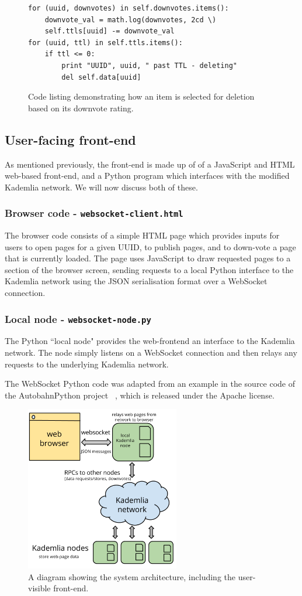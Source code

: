 \begin{figure}[H]
	\begin{lstlisting}
for (uuid, downvotes) in self.downvotes.items():
    downvote_val = math.log(downvotes, 2cd \)
    self.ttls[uuid] -= downvote_val
for (uuid, ttl) in self.ttls.items():
    if ttl <= 0:
        print "UUID", uuid, " past TTL - deleting"
        del self.data[uuid]
	\end{lstlisting}
    \caption{Code listing demonstrating how an item is selected for deletion based on its downvote rating.}
    \label{fig:code-downvote}
\end{figure}

\subsection{User-facing front-end}

As mentioned previously, the front-end is made up of of a JavaScript and HTML web-based front-end, and a Python program which
interfaces with the modified Kademlia network. We will now discuss both of these.

\subsubsection{Browser code - \texttt{websocket-client.html}}

The browser code consists of a simple HTML page which provides inputs for users to open pages for a given UUID, to publish pages,
and to down-vote a page that is currently loaded. The page uses JavaScript to draw requested pages to a section of the browser screen,
sending requests to a local Python interface to the Kademlia network using the JSON serialisation format over a WebSocket connection.

\subsubsection{Local node - \texttt{websocket-node.py}}

The Python ``local node" provides the web-frontend an interface to the Kademlia network. The node simply listens on a WebSocket connection
and then relays any requests to the underlying Kademlia network.

The WebSocket Python code was adapted from an example in the source code of the AutobahnPython project ~\cite{websocket}, which is released
under the Apache license. 

\begin{figure}[H]
    \centering
    \includegraphics[width=0.6\textwidth]{img/arch-frontend.png}
    \caption{A diagram showing the system architecture, including the user-visible front-end.}
    \label{fig:arch-frontend}
\end{figure}